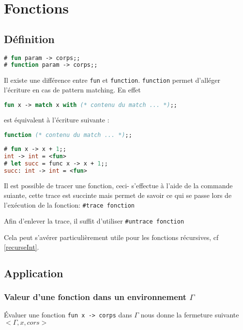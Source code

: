 \chapter{Fonctions}
\label{fonctions}
\section{Définition}
	\begin{lstlisting}[language=Caml, caption=Sytaxe d'une définition de fonction]
# fun param -> corps;;		
# function param -> corps;;
\end{lstlisting}
\begin{remarque}Il existe une différence entre \texttt{fun} et \texttt{function}. \texttt{function} permet d'alléger l'écriture en cas
	de pattern matching. En effet 
	\begin{lstlisting}[language=Caml, numbers=none, framerule=0pt]
	fun x -> match x with (* contenu du match ... *);;
\end{lstlisting}

	est équivalent à l'écriture suivante : 	
	\begin{lstlisting}[language=Caml, numbers=none, framerule=0pt]
	function (* contenu du match ... *);;
	\end{lstlisting}
	\end{remarque}
			\begin{exemple}
	\begin{lstlisting}[language=Caml, caption=Sytaxe d'une définition de fonction, numbers=none, framerule=0pt]
# fun x -> x + 1;;		
int -> int = <fun>
# let succ = func x -> x + 1;; 
succ: int -> int = <fun>
\end{lstlisting}
				\end{exemple}
\begin{remarque}
Il est possible de tracer une fonction, ceci- s'effectue à l'aide de la commande suiante, cette trace est succinte mais permet de savoir ce qui se
passe lors de l'exécution de la fonction:  \texttt{\#trace fonction}

Afin d'enlever la trace, il suffit d'utiliser \texttt{\#untrace fonction}

	Cela peut s'avérer particulièrement utile pour les fonctions récursives, cf \ref{recurseInt}.
\end{remarque}

				\section{Application}
				\subsection{Valeur d'une fonction dans un environnement $\Gamma$}
				Évaluer une fonction \texttt{fun x -> corps} dans $\Gamma$ nous donne la fermeture suivante $<\Gamma, x, cors>$
